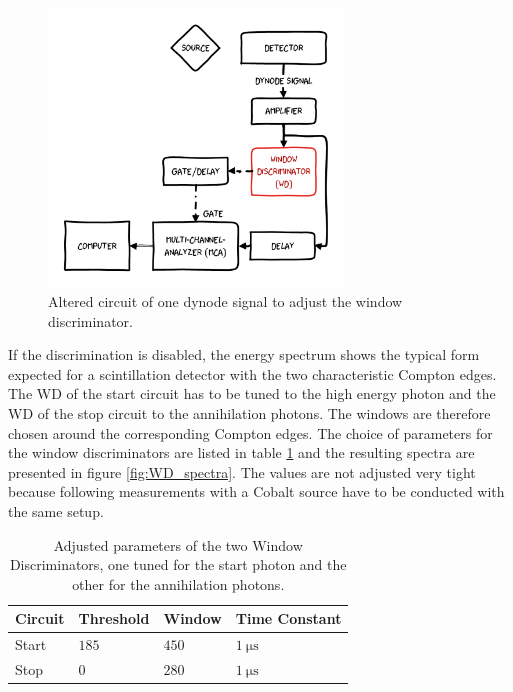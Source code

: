 \documentclass[
	paper=A4,
	parskip=full,
	chapterprefix=true,
	11pt,
	headings=normal,
	bibliography=totoc,
	listof=totoc,
	titlepage=on,
]{scrreprt}
\begin{document}
\begin{figure}[h]
 	\centering
 	\includegraphics[width=0.7\textwidth]{aufbau_wd}
 	\caption{Altered circuit of one dynode signal to adjust the window discriminator.}
	\label{fig:WD_circuit}
\end{figure}
 
If the discrimination is disabled, the energy spectrum shows the typical form expected for a scintillation detector with the two characteristic Compton edges. The WD of the start circuit has to be tuned to the high energy photon and the WD of the stop circuit to the annihilation photons. The windows are therefore chosen around the corresponding Compton edges. The choice of parameters for the window discriminators are listed in table \ref{tbl:WD_values} and the resulting spectra are presented in figure \ref{fig:WD_spectra}. The values are not adjusted very tight because following measurements with a Cobalt source have to be conducted with the same setup.

\begin{table}[htbp]
	\centering
	\begin{tabular}{ 
			l
			l
			l
			l
		}
		\toprule
		{Circuit} & {Threshold} & {Window} & {Time Constant} \\ 
		\midrule
		Start & $185$ & $450$ & $\SI{1}{\micro\second}$ \\
		Stop & $0$ & $280$ & $\SI{1}{\micro\second}$ \\
		\bottomrule
	\end{tabular}
	\caption{Adjusted parameters of the two Window Discriminators, one tuned for the start photon and the other for the annihilation photons.}
	\label{tbl:WD_values}
\end{table}
\end{document}
